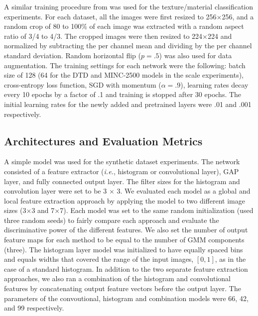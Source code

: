 \documentclass[journal]{IEEEtai}
\begin{document}
	A similar training procedure from \cite{hu2019multi,xue2018deep} was used for the texture/material classification experiments. For each dataset, all the images were first resized to 256$\times$256, and a random crop of 80 to 100\% of each image was extracted with a random aspect ratio of 3/4 to 4/3. The cropped images were then resized to 224$\times$224 and normalized by subtracting the per channel mean and dividing by the per channel standard deviation. Random horizontal flip ($p=.5$) was also used for data augmentation. The training settings for each network were the following: batch size of 128 (64 for the DTD and MINC-2500 models in the scale experiments), cross-entropy loss function, SGD with momentum ($\alpha=.9$), learning rates decay every 10 epochs by a factor of .1 and training is stopped after 30 epochs. The initial learning rates for the newly added and pretrained layers were .01 and .001 respectively.

	\subsection{Architectures and Evaluation Metrics}
	\label{sect:architecture} 
	A simple model was used for the synthetic dataset experiments. The network consisted of a feature extractor (\textit{i.e.}, histogram or convolutional layer), GAP layer, and fully connected output layer. The filter sizes for the histogram and convolution layer were set to be 3 $\times$ 3. We evaluated each model as a global and local feature extraction approach by applying the model to two different image sizes (3$\times$3 and 7$\times$7). Each model was set to the same random initialization (used three random seeds) to fairly compare each approach and evaluate the discriminative power of the different features. We also set the number of output feature maps for each method to be equal to the number of GMM components (three). The histogram layer model was initialized to have equally spaced bins and equals widths that covered the range of the input images, $[0,1]$, as in the case of a standard histogram. In addition to the two separate feature extraction approaches, we also ran a combination of the histogram and convolutional features by concatenating output feature vectors before the output layer. The parameters of the convoutional, histogram and combination models were 66, 42, and 99 respectively. 
	
\end{document}
